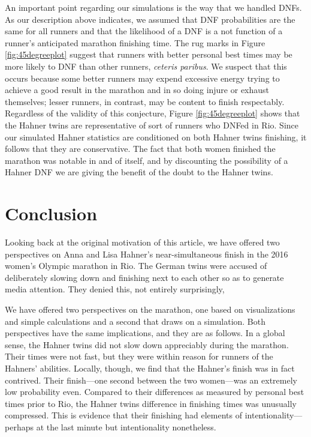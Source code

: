 \documentclass[12pt,titlepage]{article}
\begin{document}
An important point regarding our simulations is the way that we
handled DNFs.  As our description above indicates, we assumed that DNF
probabilities are the same for all runners and that the likelihood of
a DNF is a not function of a runner's anticipated marathon finishing
time.  The rug marks in Figure \ref{fig:45degreeplot} suggest that
runners with better personal best times may be more likely to DNF than
other runners, \emph{ceteris paribus}.  We suspect that this occurs
because some better runners may expend excessive energy trying to
achieve a good result in the marathon and in so doing injure or
exhaust themselves; lesser runners, in contrast, may be content to
finish respectably.  Regardless of the validity of this conjecture,
Figure \ref{fig:45degreeplot} shows that the Hahner twins are
representative of sort of runners who DNFed in Rio.  Since our
simulated Hahner statistics are conditioned on both Hahner twins
finishing, it follows that they are conservative.  The fact that both
women finished the marathon was notable in and of itself, and by
discounting the possibility of a Hahner DNF we are giving the benefit
of the doubt to the Hahner twins.

\section*{Conclusion}

Looking back at the original motivation of this article, we have
offered two perspectives on Anna and Lisa Hahner's near-simultaneous
finish in the 2016 women's Olympic marathon in Rio.  The German twins
were accused of deliberately slowing down and finishing next to each
other so as to generate media attention.  They denied this, not
entirely surprisingly,

We have offered two perspectives on the marathon, one based on
visualizations and simple calculations and a second that draws on a
simulation.  Both perspectives have the same implications, and they
are as follows.  In a global sense, the Hahner twins did not slow down
appreciably during the marathon.  Their times were not fast, but they
were within reason for runners of the Hahners' abilities.  Locally,
though, we find that the Hahner's finish was in fact contrived.  Their
finish---one second between the two women---was an extremely low
probability even.  Compared to their differences as measured by
personal best times prior to Rio, the Hahner twins difference in
finishing times was unusually compressed.  This is evidence that their
finishing had elements of intentionality---perhaps at the last minute
but intentionality nonetheless.
\end{document}
